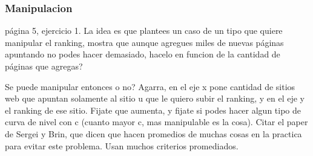 \subsubsection{Manipulacion}
página 5, ejercicio 1. La idea es que plantees un caso de un tipo que quiere manipular el ranking, mostra que aunque agregues miles de nuevas páginas apuntando no podes hacer demasiado, hacelo en funcion de la cantidad de páginas que agregas?

Se puede manipular entonces o no? Agarra, en el eje x pone cantidad de sitios web que apuntan solamente al sitio u que le quiero subir el ranking, y en el eje y el ranking de ese sitio. Fijate que aumenta, y fijate si podes hacer algun tipo de curva de nivel con c (cuanto mayor c, mas manipulable es la cosa). Citar el paper de Sergei y Brin, que dicen que hacen promedios de muchas cosas en la practica para evitar este problema. Usan muchos criterios promediados.